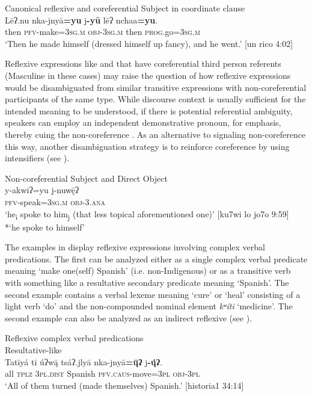 \documentclass[output=paper]{../langscibook}
\begin{document}
\ea\label{ex:campbell:23}
{Canonical reflexive and coreferential Subject in coordinate clause}\\
\gll Lēʔ.nu  nka-jnyā\textbf{=yu}  j\textbf{{}-yū}  lēʔ  nchaa\textbf{=yu}.\\
     then  \textsc{pfv}{}-make=\textsc{3sg}.\textsc{m}  \textsc{obj}{}-\textsc{3sg}.\textsc{m}  then  \textsc{prog}.go=\textsc{3sg}.\textsc{m}\\
\glt ‘Then he made himself (dressed himself up fancy), and he went.’ [un rico 4:02]
\z


Reflexive expressions like  and  that have coreferential third person referents (Masculine in these cases) may raise the question of how reflexive expressions would be disambiguated from similar transitive expressions with non-coreferential participants of the same type. While discourse context is usually sufficient for the intended meaning to be understood, if there is potential referential ambiguity, speakers can employ an independent demonstrative pronoun, for emphasis, thereby cuing the non-coreference . As an alternative to signaling non-coreference this way, another disambiguation strategy is to reinforce coreference by using intensifiers (see ).


\ea\label{ex:campbell:24}
{Non-coreferential Subject and Direct Object}\\
\gll y-akwiʔ=yu  j-nuwę̄ʔ\\
     \textsc{pfv}{}-speak=\textsc{3sg}.\textsc{m}  \textsc{obj-3.ana}\\
\glt ‘he\textsubscript{i} spoke to him\textsubscript{j} (that less topical aforementioned one)’ [ku7wi lo jo7o 9:59]\\
*‘he spoke to himself’
\z


The examples in  display reflexive expressions involving complex verbal predications. The first can be analyzed either as a single complex verbal predicate meaning ‘make one(self) Spanish’ (i.e. non-Indigenous) or as a transitive verb with something like a resultative secondary predicate meaning ‘Spanish’. The second example contains a verbal lexeme meaning ‘cure’ or ‘heal’ consisting of a light verb ‘do’ and the non-compounded nominal element \textit{kʷítī} ‘medicine’. The second example can also be analyzed as an indirect reflexive (see ).


\ea\label{ex:campbell:25}
{Reflexive complex verbal predications}\\
\ea\label{ex:campbell:25a}
{  Resultative-like}\\
\gll Tatīyá  tī  úʔw\={ą}  tsáʔ.jlyā  nka-jnyā\textbf{=\={\k{u}}ʔ}  j\textbf{{}-\'{\k{u}}ʔ}.\\
     all  \textsc{tplz}  \textsc{3pl.dist}  Spanish  \textsc{pfv.caus-}move=3\textsc{pl}  \textsc{obj-3pl}\\
\glt ‘All of them turned (made themselves) Spanish.’ [historia1 34:14]
\end{document}
